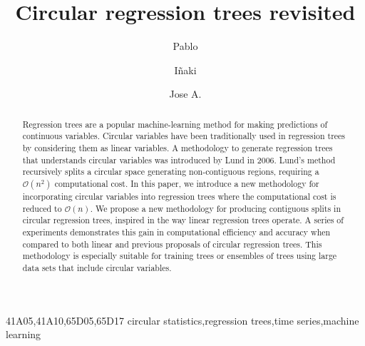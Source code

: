\documentclass[times,twocolumn,final,authoryear]{elsarticle}
\begin{document}
\begin{frontmatter}

\title{Circular regression trees revisited}

\author[1]{Pablo }
\author[2]{I\~naki }
\author[2,3]{Jose A. }

\address[1]{National Computational Infrastructure, Building 143, Australian National University, Ward Road, ACT, 2601, Australia}
\address[2]{Intelligent Systems Group, Computer Science Faculty, University of the Basque Country, Paseo de Manuel Lardizabal, Donostia, 20018, Spain}
\address[3]{Basque Center for Applied Mathematics (BCAM), Mazarredo 14, Bilbao, 48009, Spain}





\begin{abstract}
Regression trees are a popular machine-learning method for making predictions of continuous variables. Circular variables have been traditionally used in regression trees by considering them as linear variables. A methodology to generate regression trees that understands circular variables was introduced by Lund in 2006. Lund's method recursively splits a circular space generating non-contiguous regions, requiring a $\mathcal{O}(n^2)$ computational cost. In this paper, we introduce a new methodology for incorporating circular variables into regression trees where the computational cost is reduced to $\mathcal{O}(n)$. We propose a new methodology for producing contiguous splits in circular regression trees, inspired in the way linear regression trees operate. A series of experiments demonstrates this gain in computational efficiency and accuracy when compared to both linear and previous proposals of circular regression trees. This methodology is especially suitable for training trees or ensembles of trees using large data sets that include circular variables.
\end{abstract}

\begin{keyword}
\MSC 41A05\sep 41A10\sep 65D05\sep 65D17
\KWD circular statistics\sep regression trees\sep time series\sep machine learning

\end{keyword}

\end{frontmatter}
\end{document}
